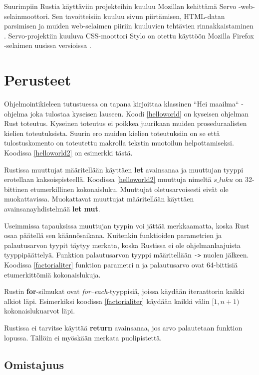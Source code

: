 \documentclass[finnish]{tktltiki2}
\theoremstyle{definition}
\theoremstyle{remark}
\begin{document}
Suurimpiin Rustia käyttäviin projekteihin kuuluu Mozillan kehittämä Servo -web-selainmoottori. Sen tavoitteisiin kuuluu sivun piirtämisen, HTML-datan parsimisen ja muiden web-selaimen piiriin kuuluvien tehtävien rinnakkaistaminen \cite{QuantumSuperFastCSSEngine}. Servo-projektiin kuuluva CSS-moottori Stylo on otettu käyttöön Mozilla Firefox -selaimen uusissa versioissa \cite{StyloIncludedInFirefox}.

\section{Perusteet}

Ohjelmointikieleen tutustuessa on tapana kirjoittaa klassinen ``Hei maailma`` -ohjelma joka tulostaa kyseisen lauseen. Koodi \ref{helloworld} on kyseisen ohjelman Rust toteutus. Kyseinen toteutus ei poikkea juurikaan muiden proseduraalisten kielien toteutuksista. Suurin ero muiden kielien toteutuksiin on se että tulostuskomento on toteutettu makrolla tekstin muotoilun helpottamiseksi. Koodissa \ref{helloworld2} on esimerkki tästä.

Rustissa muuttujat määritellään käyttäen \textbf{let} avainsanaa ja muuttujan tyyppi erotellaan kaksoispisteellä. Koodissa \ref{helloworld2} muuttuja nimeltä \texttt{$s\_luku$} on 32-bittinen etumerkillinen kokonaisluku. Muuttujat oletusarvoisesti eivät ole muokattavissa. Muokattavat muuttujat määritellään käyttäen avainsanayhdistelmää \textbf{let mut}. 

Useimmissa tapauksissa muuttujan tyypin voi jättää merkkaamatta, koska Rust osaa päätellä sen käännösaikana. Kuitenkin funktioiden parametrien ja palautusarvon tyypit täytyy merkata, koska Rustissa ei ole ohjelmanlaajuista tyyppipäättelyä. Funktion palautusarvon tyyppi määritellään \texttt{->} nuolen jälkeen. Koodissa \ref{factorialiter} funktion parametri n ja palautusarvo ovat 64-bittisiä etumerkittömiä kokonaislukuja.

Rustin \textbf{for}-silmukat ovat \textit{for--each}-tyyppisiä, joissa käydään iteraattorin kaikki alkiot läpi. Esimerkiksi koodissa \ref{factorialiter} käydään kaikki välin $[1, n+1)$ kokonaislukuarvot läpi.

Rustissa ei tarvitse käyttää \textbf{return} avainsanaa, jos arvo palautetaan funktion lopussa. Tällöin ei myöskään merkata puolipistettä.

\subsection{Omistajuus}
\end{document}
